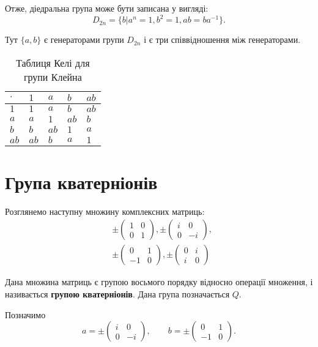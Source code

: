 Отже, діедральна група може бути записана у вигляді:
\[
D_{2n} = \{ b| a^n =1, b^2 = 1, ab=ba^{-1}\}.
\]

Тут $\{a,b\}$ є генераторами групи $D_{2n}$ і є три співвідношення між генераторами.



\begin{table}[h!]
 \centering 
 \normalsize 
\begin{tabular}{|l|l|l|l|l|}
\hline
$\cdot$ & $1$ & $a$ & $b$ & $ab$ \\ \hline
$1$ & $1$ & $a$ & $b$ & $ab$ \\ \hline
$a$ & $a$ & $1$ & $ab$ & $b$ \\ \hline
$b$ & $b$ & $ab$ & $1$ & $a$ \\ \hline
$ab$ & $ab$ & $b$ & $a$ & $1$ \\ \hline
\end{tabular}
\caption{Таблиця Келі для групи Клейна}
\label{tabklein}
\end{table} 



\section{Група кватерніонів}\label{section.1.3}
Розглянемо наступну множину комплексних матриць:
\[
\begin{split}
& \pm \begin{pmatrix}1&0\\0&1\end{pmatrix},
 \pm \begin{pmatrix}i&0\\0&-i\end{pmatrix}, \\
& \pm \begin{pmatrix}0&1\\-1&0\end{pmatrix},
 \pm \begin{pmatrix}0&i\\i&0\end{pmatrix}
\end{split}  
\]

Дана множина матриць є групою восьмого порядку відносно операції множення, і називається \textbf{групою кватерніонів}. Дана група позначається $Q$.

Позначимо 
\[ 
a= \pm \begin{pmatrix}i&0\\0&-i\end{pmatrix}, \qquad b= 
 \pm \begin{pmatrix}0&1\\-1&0\end{pmatrix}. 
 \]
 
